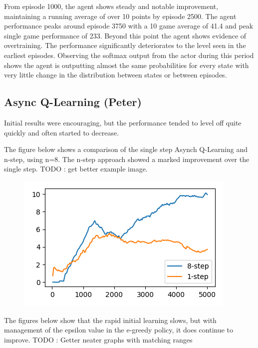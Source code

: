 \documentclass{article}
\begin{document}
From episode 1000, the agent shows steady and notable improvement, maintaining a running average of over 10 points by episode 2500. The agent performance peaks around episode 3750 with a 10 game average of 41.4 and peak single game performance of 233. Beyond this point the agent shows evidence of overtraining. The performance significantly deteriorates to the level seen in the earliest episodes. Observing the softmax output from the actor during this period shows the agent is outputting almost the same probabilities for every state with very little change in the distribution between states or between episodes.

\subsection{Async Q-Learning (Peter)}

Initial results were encouraging, but the performance tended to level off quite quickly and often started to decrease.

The figure below shows a comparison of the single step Asynch Q-Learning and n-step, using n=8. The n-step approach showed a marked improvement over the single step. TODO : get better example image.

\begin{figure}[H]
\includegraphics[scale=0.4]{"async_q_learn_n_step"}
\end{figure}

The figures below show that the rapid initial learning slows, but with management of the epsilon value in the e-greedy policy, it does continue to improve.
TODO : Getter neater graphs with matching ranges
\end{document}
